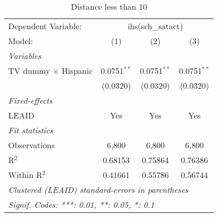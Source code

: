 \begin{table}[htbp]
\centering
\caption{Distance less than 10}
\begin{tabular}{lccc}
\tabularnewline\midrule\midrule
Dependent Variable:&\multicolumn{3}{c}{ihs(sch\_satact)}\\
Model:&(1) & (2) & (3)\\
\midrule \emph{Variables}&   &   &  \\
TV dummy $\times$ Hispanic & 0.0751$^{**}$ & 0.0751$^{**}$ & 0.0751$^{**}$\\
  &(0.0320) & (0.0320) & (0.0320)\\
\midrule \emph{Fixed-effects}&   &   &  \\
LEAID & Yes & Yes & Yes\\
\midrule \emph{Fit statistics}&  & & \\
Observations & 6,800&6,800&6,800\\
R$^2$ & 0.68153&0.75864&0.76386\\
Within R$^2$ & 0.41661&0.55786&0.56744\\
\midrule\midrule\multicolumn{4}{l}{\emph{Clustered (LEAID) standard-errors in parentheses}}\\
\multicolumn{4}{l}{\emph{Signif. Codes: ***: 0.01, **: 0.05, *: 0.1}}\\
\end{tabular}
\end{table}

